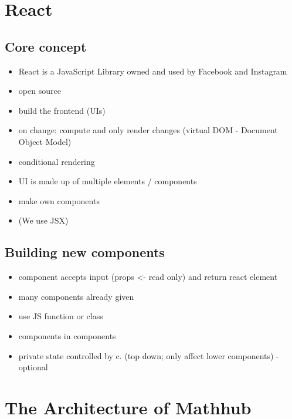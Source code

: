 \documentclass[11pt,a4paper]{article}
\begin{document}
\section{React}
	\subsection{Core concept}
	\begin{itemize}
	\item React is a JavaScript Library owned and used by Facebook and Instagram
	\item open source
	\item build the frontend (UIs)
	\item on change: compute and only render changes (virtual DOM - Document Object Model)
	\item conditional rendering
	\item UI is made up of multiple elements / components	
	\item make own components
	\item (We use JSX)
\end{itemize}		
	
	\subsection{Building new components}
	\begin{itemize}
	\item component accepts input (props <- read only) and return react element
	\item many components already given
	\item use JS function or class
	\item components in components
	\item private state controlled by c. (top down; only affect lower components) - optional
	\end{itemize}

\section{The Architecture of Mathhub}
\end{document}
